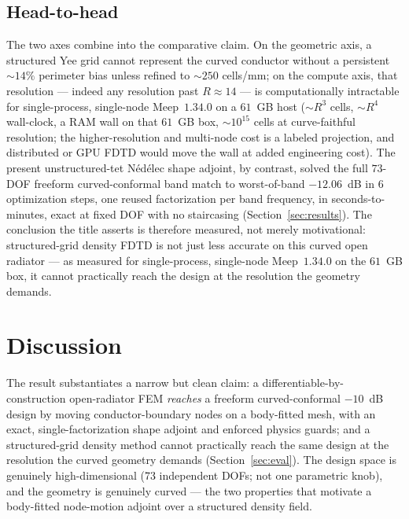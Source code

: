 \documentclass{anvil-paper}
\begin{document}
\subsection{Head-to-head}
\label{sec:headtohead}

The two axes combine into the comparative claim. On the geometric axis, a
structured Yee grid cannot represent the curved conductor without a persistent
$\sim\!14\%$ perimeter bias unless refined to $\sim\!250$ cells/mm; on the
compute axis, that resolution --- indeed any resolution past $R\!\approx\!14$ ---
is computationally intractable for single-process, single-node Meep~$1.34.0$ on
a $61$~GB host ($\sim\!R^3$ cells, $\sim\!R^4$ wall-clock, a RAM
wall on that $61$~GB box, $\sim\!10^{15}$ cells at curve-faithful resolution;
the higher-resolution and multi-node cost is a labeled projection, and
distributed or GPU FDTD would move the wall at added engineering cost). The
present unstructured-tet N\'ed\'elec shape adjoint, by contrast, solved the full
$73$-DOF freeform curved-conformal band match to worst-of-band $-12.06$~dB in
$6$ optimization steps, one reused factorization per band frequency, in
seconds-to-minutes, exact at fixed DOF with no staircasing
(Section~\ref{sec:results}). The conclusion the title asserts is therefore
measured, not merely motivational: structured-grid density FDTD is not just less
accurate on this curved open radiator --- as measured for single-process,
single-node Meep~$1.34.0$ on the $61$~GB box, it cannot practically reach the
design at the resolution the geometry demands.

\section{Discussion}
\label{sec:discussion}

The result substantiates a narrow but clean claim: a differentiable-by-construction
open-radiator FEM \emph{reaches} a freeform curved-conformal $-10$~dB design by
moving conductor-boundary nodes on a body-fitted mesh, with an exact,
single-factorization shape adjoint and enforced physics guards; and a
structured-grid density method cannot practically reach the same design at the
resolution the curved geometry demands (Section~\ref{sec:eval}). The design
space is genuinely high-dimensional (73 independent DOFs; not one parametric
knob), and the geometry is genuinely curved --- the two properties that motivate
a body-fitted node-motion adjoint over a structured density field.
\end{document}
